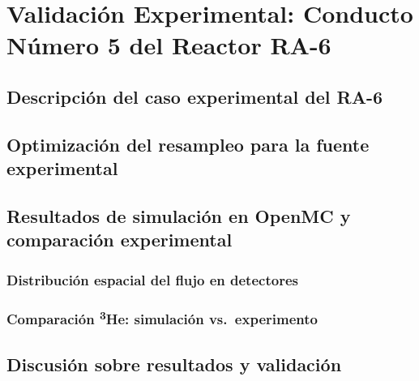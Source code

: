 \chapter{Validación Experimental: Conducto Número 5 del Reactor RA-6}
\label{chap:validacion-ra6}

\section{Descripción del caso experimental del RA-6}
\label{sec:descripcion-w}

\section{Optimización del resampleo para la fuente experimental}
\label{sec:optimizacion-w}

\section{Resultados de simulación en OpenMC y comparación experimental}
\label{sec:resultados-w}
\subsection{Distribución espacial del flujo en detectores}
\subsection{Comparación \textsuperscript{3}He: simulación vs.\ experimento}

\section{Discusión sobre resultados y validación}
\label{sec:discusion-w}
